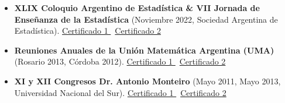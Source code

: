 \documentclass{CV_template}
\begin{document}
\begin{itemize}
    \item \textbf{XLIX Coloquio Argentino de Estadística \& VII Jornada de Enseñanza de la Estadística} (Noviembre 2022, Sociedad Argentina de Estadística). \href{https://1drv.ms/b/s!Anr_tvZIYrhwidR37GyX8JbHkHBeGA?e=D9ooCM}{Certificado 1 {\footnotesize\faExternalLink}} \textbar\ \href{https://1drv.ms/b/s!Anr_tvZIYrhwidR4_kL8_XpkJeDw7w?e=JPBoeX}{Certificado 2 {\footnotesize\faExternalLink}}
    \item \textbf{Reuniones Anuales de la Unión Matemática Argentina (UMA)} (Rosario 2013, Córdoba 2012). \href{https://1drv.ms/b/s!Anr_tvZIYrhwgc9MosO5ebGk9rRf-w}{Certificado 1 {\footnotesize\faExternalLink}} \textbar\ \href{https://1drv.ms/u/s!Anr_tvZIYrhwgc8af6-T-A7NeXaSlw}{Certificado 2 {\footnotesize\faExternalLink}}
    \item \textbf{XI y XII Congresos Dr. Antonio Monteiro} (Mayo 2011, Mayo 2013, Universidad Nacional del Sur). \href{https://1drv.ms/b/s!Anr_tvZIYrhwgc9GYBGAGbHQCQqjzQ}{Certificado 1 {\footnotesize\faExternalLink}} \textbar\ \href{https://1drv.ms/u/s!Anr_tvZIYrhwgc8dRt9t2V22iKrg2g}{Certificado 2 {\footnotesize\faExternalLink}}
\end{itemize}
\end{document}
